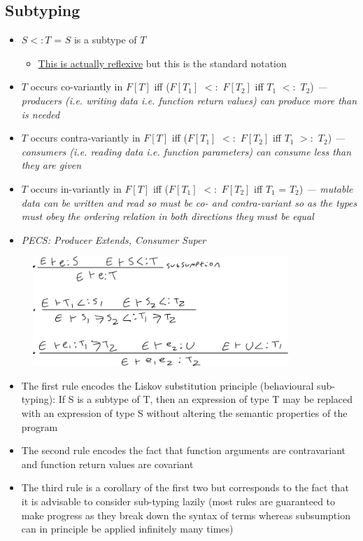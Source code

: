 \documentclass[20pt,a4paper,landscape]{extarticle}
\begin{document}
\begin{flushleft}
\subsection{Subtyping}
\begin{itemize}
\item $S<:T$ = $S$ is a subtype of $T$
    \begin{itemize}
    \item \underline{This is actually reflexive} but this is the standard notation
    \end{itemize}
\item $T$ occurs co-variantly in $F[T]$ iff ($F[T_1]$ $<:$ $F[T_2]$ iff $T_1$ $<:$ $T_2$) \textit{--- producers (i.e. writing data i.e. function return values) can produce more than is needed}
\item $T$ occurs contra-variantly in $F[T]$ iff ($F[T_1]$ $<:$ $F[T_2]$ iff $T_1$ $>:$ $T_2$) \textit{--- consumers (i.e. reading data i.e. function parameters) can consume less than they are given}
\item $T$ occurs in-variantly in $F[T]$ iff ($F[T_1]$ $<:$ $F[T_2]$ iff $T_1$ = $T_2$) \textit{--- mutable data can be written and read so must be co- and contra-variant so as the types must obey the ordering relation in both directions they must be equal}
\item \textit{PECS: Producer Extends, Consumer Super}
\end{itemize}
\FloatBarrier
\begin{figure}[h]
\begin{center}
\includegraphics[width=0.86\textwidth]{meta/cs349/Subtype_Rules.pdf}{}
\end{center}
\end{figure}
\FloatBarrier
\begin{itemize}
\item The first rule encodes the Liskov substitution principle (behavioural sub-typing): If S is a subtype of T, then an expression of type T may be replaced with an expression of type S without altering the semantic properties of the program
\item The second rule encodes the fact that function arguments are contravariant and function return values are covariant
\item The third rule is a corollary of the first two but corresponds to the fact that it is advisable to consider sub-typing lazily (most rules are guaranteed to make progress as they break down the syntax of terms whereas subsumption can in principle be applied infinitely many times)
\end{itemize}

\end{flushleft}
\end{document}
